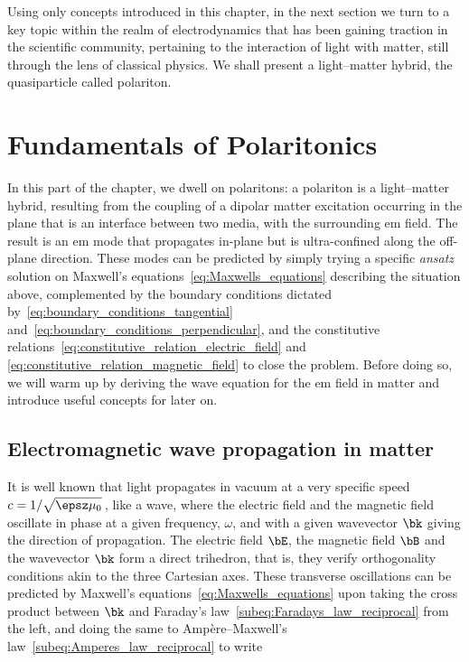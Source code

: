 Using only concepts introduced in this chapter, in the next section we turn to a key topic within the realm of electrodynamics that has been gaining traction in the scientific community, pertaining to the interaction of light with matter, still through the lens of classical physics.
We shall present a light--matter hybrid, the quasiparticle called polariton.

\section{Fundamentals of Polaritonics}
\label{sec:polaritonics_fundamentals}

In this part of the chapter, we dwell on polaritons: a polariton is a light--matter hybrid, resulting from the coupling of a dipolar matter excitation occurring in the plane that is an interface between two media, with the surrounding \gls{em} field.
The result is an \gls{em} mode that propagates in-plane but is ultra-confined along the off-plane direction.
These modes can be predicted by simply trying a specific \textit{ansatz} solution on Maxwell's equations~\eqref{eq:Maxwells_equations} describing the situation above, complemented by the boundary conditions dictated by~\eqref{eq:boundary_conditions_tangential} and~\eqref{eq:boundary_conditions_perpendicular}, and the constitutive relations~\eqref{eq:constitutive_relation_electric_field} and \eqref{eq:constitutive_relation_magnetic_field} to close the problem.
Before doing so, we will warm up by deriving the wave equation for the \gls{em} field in matter and introduce useful concepts for later on.


\subsection{Electromagnetic wave propagation in matter}
\label{subsec:waves_in_matter}

It is well known that light propagates in vacuum at a very specific speed $c=1/\sqrt{\epsz \mu_0}$\,, like a wave, where the electric field and the magnetic field oscillate in phase at a given frequency, $\omega$, and with a given wavevector $\bk$ giving the direction of propagation.
The electric field $\bE$, the magnetic field $\bB$ and the wavevector $\bk$ form a direct trihedron, that is, they verify orthogonality conditions akin to the three Cartesian axes.
These transverse oscillations can be predicted by Maxwell's equations~\eqref{eq:Maxwells_equations} upon taking the cross product between $\bk$ and Faraday's law~\eqref{subeq:Faradays_law_reciprocal} from the left, and doing the same to Amp\`ere--Maxwell's law~\eqref{subeq:Amperes_law_reciprocal} to write

